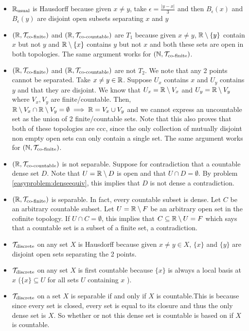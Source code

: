 \documentclass{article}
\begin{document}
{\begin{center}
\begin{tabular}{|c|c|c|c|c|c|c|c|}
        \end{tabular}
    \end{center}
    \begin{itemize}
        \item $\mathbb{R}_{\text{usual}}$ is Hausdorff because given $x\neq y$, take $\epsilon = \frac{\lvert y-x\rvert}{3}$ and then $B_{\epsilon}(x)$ and $B_{\epsilon}(y)$ are disjoint open subsets separating $x$ and $y$
        \item $(\mathbb{R}, \mathcal{T}_{\text{co-finite}})$ and $(\mathbb{R}, \mathcal{T}_{\text{co-countable}})$ are $T_{1}$ because given $x\neq y$, $\mathbb{R}\setminus\{y\}$ contain $x$ but not $y$ and $\mathbb{R}\setminus\{x\}$ contains $y$ but not $x$ and both these sets are open in both topologies. The same argument works for $(\mathbb{N}, \mathcal{T}_{\text{co-finite}})$.
        \item $(\mathbb{R}, \mathcal{T}_{\text{co-finite}})$ and $(\mathbb{R}, \mathcal{T}_{\text{co-countable}})$ are not $T_{2}$. We note that any 2 points cannot be separated. Take $x\neq y\in \mathbb{R}$. Suppose $U_{x}$ contains $x$ and $U_{y}$ contains $y$ and that they are disjoint. We know that $U_{x} = \mathbb{R}\setminus V_{x}$ and $U_{y} = \mathbb{R}\setminus V_{y}$ where $V_{x},V_{y}$ are finite/countable. Then, $\mathbb{R}\setminus V_{x} \cap \mathbb{R}\setminus V_{y} = \emptyset \implies \mathbb{R} = V_{x}\cup V_{y}$ and we cannot express an uncountable set as the union of 2 finite/countable sets. Note that this also proves that both of these topologies are ccc, since the only collection of mutually disjoint non empty open sets can only contain a single set. The same argument works for $(\mathbb{N}, \mathcal{T}_{\text{co-finite}})$.
        \item $(\mathbb{R}, \mathcal{T}_{\text{co-countable}})$ is not separable. Suppose for contradiction that a countable dense set $D$. Note that $U = \mathbb{R}\setminus D$ is open and that $U \cap D = \emptyset$. By problem \ref{easyproblem:denseequiv}, this implies that $D$ is not dense a contradiction.
        \item $(\mathbb{R}, \mathcal{T}_{\text{co-finite}})$ is separable. In fact, every countable subset is dense. Let $C$ be an arbitrary countable subset. Let $U = \mathbb{R}\setminus F$ be an arbitrary open set in the cofinite topology. If $U\cap C = \emptyset$, this implies that $C\subseteq \mathbb{R}\setminus U = F$ which says that a countable set is a subset of a finite set, a contradiction.
        \item $\mathcal{T}_{\text{discrete}}$ on any set $X$ is Hausdorff because given $x\neq y\in X$, $\{x\}$ and $\{y\}$ are disjoint open sets separating the 2 points. 
        \item $\mathcal{T}_{\text{discrete}}$ on any set $X$ is first countable because $\{x\}$ is always a local basis at $x$ ($\{x\}\subseteq U$ for all sets $U$ containing $x$ ).
        \item $\mathcal{T}_{\text{discrete}}$ on a set $X$ is separable if and only if $X$ is countable.This is because since every set is closed, every set is equal to its closure and thus the only dense set is $X$. So whether or not this dense set is countable is based on if $X$ is countable.

\end{itemize}}
\end{document}
